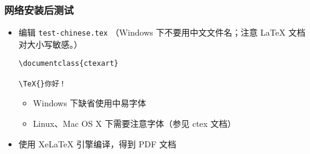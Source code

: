 



\begin{frame}[fragile]
  \frametitle{网络安装后测试}

  \begin{itemize}
    \item 编辑 \texttt{test-chinese.tex} （Windows 下不要用中文文件名；注意
      \LaTeX{} 文档对大小写敏感。）
      \begin{center}
        \begin{verbatim}
\documentclass{ctexart}

\TeX{}你好！

        \end{verbatim}
      \end{center}
      \begin{itemize}
        \item Windows 下缺省使用中易字体
        \item Linux、Mac OS X 下需要注意字体（参见 ctex 文档）
      \end{itemize}
    \item 使用 XeLaTeX 引擎编译，得到 PDF 文档
      \begin{center}
      \end{center}
  \end{itemize}
\end{frame}

